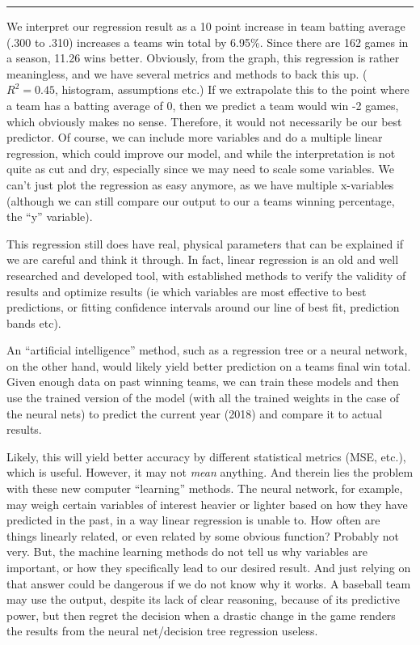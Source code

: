 \documentclass[12pt,twoside]{book}
\begin{document}
\vspace{-1.25cm}
\setlength\parindent{9cm}\rule{3cm}{0.6pt}

\setlength\parindent{.75cm}
	
	We interpret our regression result as a 10 point increase in team batting average (.300 to .310) increases a teams win total by 6.95\%.  Since there are 162 games in a season, 11.26 wins better.  Obviously, from the graph, this regression is rather meaningless, and we have several metrics and methods to back this up.  ($R^2=0.45$, histogram, assumptions etc.)  If we extrapolate this to the point where a team has a batting average of 0, then we predict a team would win -2 games, which obviously makes no sense.  Therefore, it would not necessarily be our best predictor.  Of course, we can include more variables and do a multiple linear regression, which could improve our model, and while the interpretation is not quite as cut and dry, especially since we may need to scale some variables.  We can't just plot the regression as easy anymore, as we have multiple x-variables (although we can still compare our output to our a teams winning percentage, the ``y'' variable).  
	
	This regression still does have real, physical parameters that can be explained if we are careful and think it through.  In fact, linear regression is an old and well researched and developed tool, with established methods to verify the validity of results and optimize results (ie which variables are most effective to best predictions, or fitting confidence intervals around our line of best fit, prediction bands etc).  
	
	An ``artificial intelligence'' method, such as a regression tree or a neural network, on the other hand, would likely yield better prediction on a teams final win total.  Given enough data on past winning teams, we can train these models and then use the trained version of the model (with all the trained weights in the case of the neural nets) to predict the current year (2018) and compare it to actual results.  
	
	Likely, this will yield better accuracy by different statistical metrics (MSE, etc.), which is useful.  However, it may not \emph{mean} anything.  And therein lies the problem with these new computer ``learning'' methods.  The neural network, for example, may weigh certain variables of interest heavier or lighter based on how they have predicted in the past, in a way linear regression is unable to.  How often are things linearly related, or even related by some obvious function?  Probably not very.  But, the machine learning methods do not tell us why variables are important, or how they specifically lead to our desired result.  And just relying on that answer could be dangerous if we do not know why it works.  A baseball team may use the output, despite its lack of clear reasoning, because of its predictive power, but then regret the decision when a drastic change in the game renders the results from the neural net/decision tree regression useless.  
	
\end{document}
